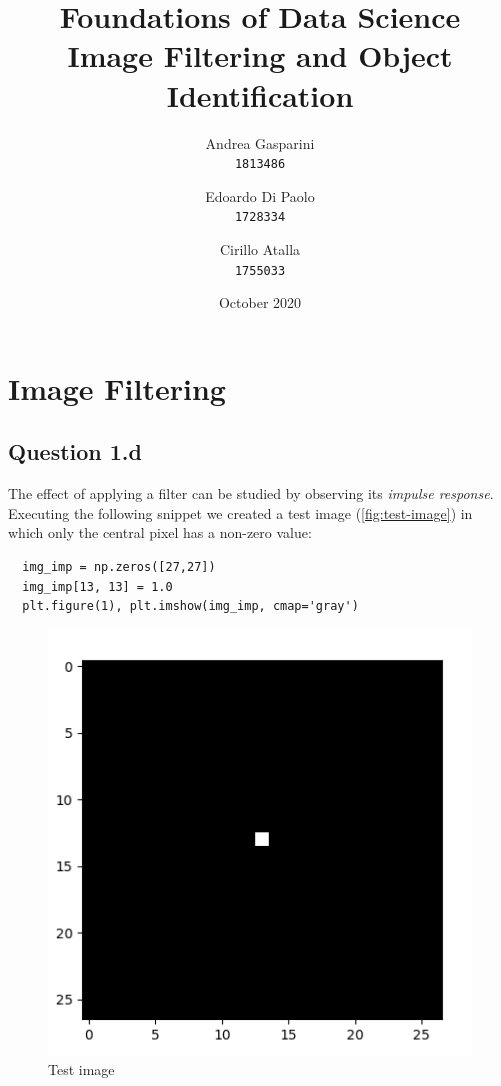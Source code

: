 \documentclass{article}
\title{Foundations of Data Science \\ Image Filtering and Object Identification}
\author{
	Andrea Gasparini \\ \texttt{1813486}
	\and
	Edoardo Di Paolo \\ \texttt{1728334}
	\and
	Cirillo Atalla \\ \texttt{1755033}
}
\date{October 2020}
\begin{document}
\maketitle
{
  \hypersetup{linkcolor=black}
  \tableofcontents
}
\newpage

\section{Image Filtering}

\subsection{Question 1.d}
The effect of applying a filter can be studied by observing its \textit{impulse response}. Executing the following snippet we created a test image (\autoref{fig:test-image}) in which only the central pixel has a non-zero value:
\begin{verbatim}
  img_imp = np.zeros([27,27])
  img_imp[13, 13] = 1.0
  plt.figure(1), plt.imshow(img_imp, cmap='gray')
\end{verbatim}

\begin{figure}[ht]
    \centering
    \includegraphics[scale=0.4]{images/Q1.d-F1.png}
    \caption{Test image}
    \label{fig:test-image}
\end{figure}
\end{document}
